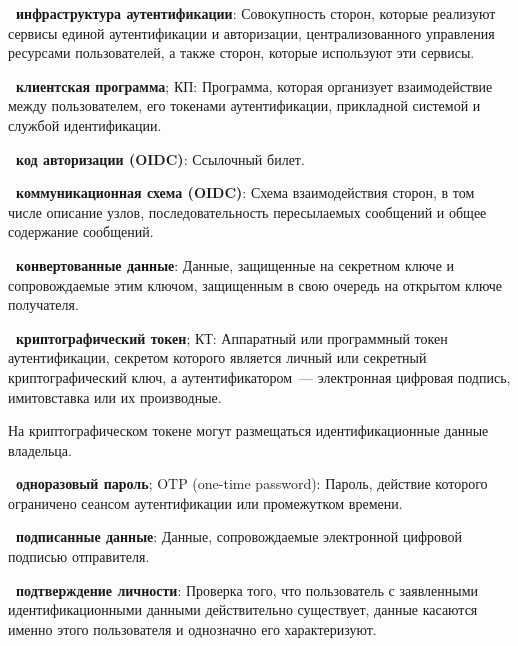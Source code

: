 
{\bf \thedefctr~инфраструктура аутентификации}:
Совокупность сторон, которые реализуют сервисы единой аутентификации и
авторизации, централизованного управления ресурсами пользователей, а также
сторон, которые используют эти сервисы.

{\bf \thedefctr~клиентская программа}; КП:
Программа, которая организует взаимодействие между пользователем, его токенами
аутентификации, прикладной системой и службой идентификации.

{\bf \thedefctr~код авторизации (OIDC)}:
Ссылочный билет.

{\bf \thedefctr~коммуникационная схема (OIDC)}:
Схема взаимодействия сторон, в том числе описание узлов, последовательность
пересылаемых сообщений и общее содержание сообщений.

{\bf \thedefctr~конвертованные данные}: %
Данные, защищенные на секретном ключе и сопровождаемые этим ключом, защищенным в
свою очередь на открытом ключе получателя.

{\bf \thedefctr~криптографический токен}; КТ:
Аппаратный или программный токен аутентификации, секретом которого является
личный или секретный криптографический ключ, а аутентификатором~---  электронная
цифровая подпись, имитовставка или их производные.

\begin{note*}
На криптографическом токене могут размещаться идентификационные данные 
владельца.
\end{note*}

{\bf \thedefctr~одноразовый пароль}; OTP (one-time password): %
Пароль, действие которого ограничено сеансом аутентификации или промежутком 
времени.

{\bf \thedefctr~подписанные данные}: %
Данные, сопровождаемые электронной цифровой подписью отправителя. 

{\bf \thedefctr~подтверждение личности}:
Проверка того, что пользователь с заявленными идентификационными данными
действительно существует, данные касаются именно этого пользователя и однозначно
его характеризуют.


%

